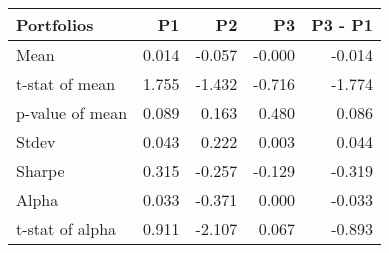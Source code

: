 \begin{tabular}{lrrrr}
\toprule
Portfolios & P1 & P2 & P3 & P3 - P1 \\
\midrule
Mean & 0.014 & -0.057 & -0.000 & -0.014 \\
t-stat of mean & 1.755 & -1.432 & -0.716 & -1.774 \\
p-value of mean & 0.089 & 0.163 & 0.480 & 0.086 \\
Stdev & 0.043 & 0.222 & 0.003 & 0.044 \\
Sharpe & 0.315 & -0.257 & -0.129 & -0.319 \\
Alpha & 0.033 & -0.371 & 0.000 & -0.033 \\
t-stat of alpha & 0.911 & -2.107 & 0.067 & -0.893 \\
\bottomrule
\end{tabular}
